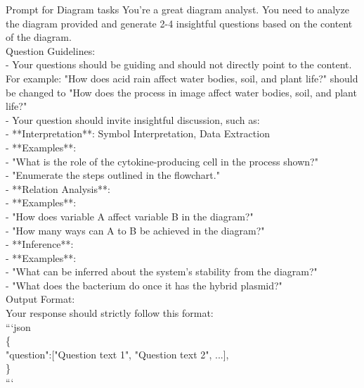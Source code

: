 \begin{figure*}[!ht] 
\begin{AIbox}{Prompt for Diagram tasks}
{You're a great diagram analyst. You need to analyze the diagram provided and generate 2-4 insightful questions based on the content of the diagram.\\
Question Guidelines:\\
- Your questions should be guiding and should not directly point to the content. For example: "How does acid rain affect water bodies, soil, and plant life?" should be changed to "How does the process in image affect water bodies, soil, and plant life?"\\
- Your question should invite insightful discussion, such as:\\
  - **Interpretation**: Symbol Interpretation, Data Extraction\\
    - **Examples**:\\
      - "What is the role of the cytokine-producing cell in the process shown?"\\
      - "Enumerate the steps outlined in the flowchart."\\
  - **Relation Analysis**:\\
    - **Examples**:\\
      - "How does variable A affect variable B in the diagram?"\\
      - "How many ways can A to B be achieved in the diagram?"\\
  - **Inference**:\\
    - **Examples**:\\
      - "What can be inferred about the system's stability from the diagram?"\\
      - "What does the bacterium do once it has the hybrid plasmid?"\\
Output Format:\\
Your response should strictly follow this format:\\
```json\\
\{\\
  "question":["Question text 1", "Question text 2", ...],\\
\}\\
```
}
\end{AIbox} 
\caption{\textbf{An Example of the prompt for Diagram task generation. }}
\label{fig: prompt_diagram}
\end{figure*}
